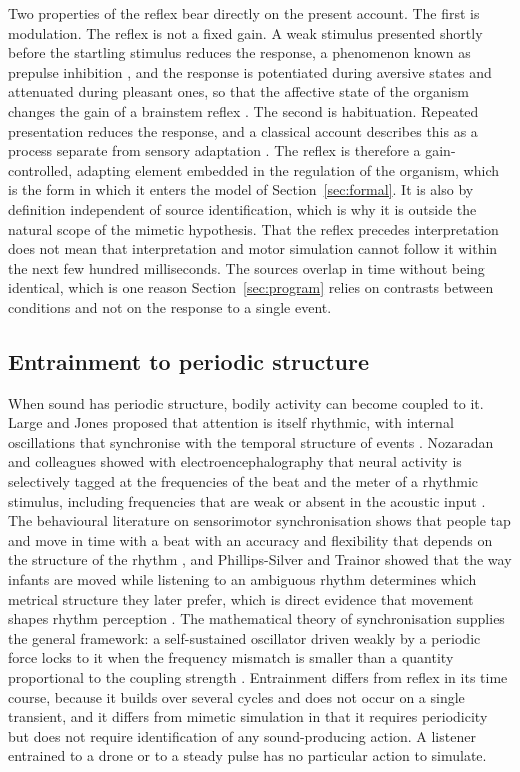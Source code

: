 \documentclass[11pt]{article}
\theoremstyle{plain}
\theoremstyle{definition}
\begin{document}
Two properties of the reflex bear directly on the present account. The first is modulation. The reflex is not a fixed gain. A weak stimulus presented shortly before the startling stimulus reduces the response, a phenomenon known as prepulse inhibition \citep{graham1975,hoffman1980}, and the response is potentiated during aversive states and attenuated during pleasant ones, so that the affective state of the organism changes the gain of a brainstem reflex \citep{lang1990}. The second is habituation. Repeated presentation reduces the response, and a classical account describes this as a process separate from sensory adaptation \citep{groves1970}. The reflex is therefore a gain-controlled, adapting element embedded in the regulation of the organism, which is the form in which it enters the model of Section~\ref{sec:formal}. It is also by definition independent of source identification, which is why it is outside the natural scope of the mimetic hypothesis. That the reflex precedes interpretation does not mean that interpretation and motor simulation cannot follow it within the next few hundred milliseconds. The sources overlap in time without being identical, which is one reason Section~\ref{sec:program} relies on contrasts between conditions and not on the response to a single event.

\subsection{Entrainment to periodic structure}

When sound has periodic structure, bodily activity can become coupled to it. Large and Jones proposed that attention is itself rhythmic, with internal oscillations that synchronise with the temporal structure of events \citep{large1999}. Nozaradan and colleagues showed with electroencephalography that neural activity is selectively tagged at the frequencies of the beat and the meter of a rhythmic stimulus, including frequencies that are weak or absent in the acoustic input \citep{nozaradan2011}. The behavioural literature on sensorimotor synchronisation shows that people tap and move in time with a beat with an accuracy and flexibility that depends on the structure of the rhythm \citep{repp2013}, and Phillips-Silver and Trainor showed that the way infants are moved while listening to an ambiguous rhythm determines which metrical structure they later prefer, which is direct evidence that movement shapes rhythm perception \citep{phillips2005}. The mathematical theory of synchronisation supplies the general framework: a self-sustained oscillator driven weakly by a periodic force locks to it when the frequency mismatch is smaller than a quantity proportional to the coupling strength \citep{pikovsky2001}. Entrainment differs from reflex in its time course, because it builds over several cycles and does not occur on a single transient, and it differs from mimetic simulation in that it requires periodicity but does not require identification of any sound-producing action. A listener entrained to a drone or to a steady pulse has no particular action to simulate.
\end{document}
